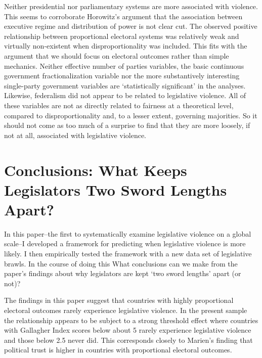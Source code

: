 \documentclass[a4paper]{article}\usepackage{graphicx, color}
\begin{document}
Neither presidential nor parliamentary systems are more associated with violence. This seems to corroborate Horowitz's \citeyearpar{Horowitz1990} argument that the association between executive regime and distribution of power is not clear cut. The observed positive relationship between proportional electoral systems was relatively weak and virtually non-existent when disproportionality was included. This fits with the argument that we should focus on electoral outcomes rather than simple mechanics. Neither effective number of parties variables, the basic continuous government fractionalization variable nor the more substantively interesting single-party government variables are `statistically significant' in the analyses. Likewise, federalism did not appear to be related to legislative violence. All of these variables are not as directly related to fairness at a theoretical level, compared to disproportionality and, to a lesser extent, governing majorities. So it should not come as too much of a surprise to find that they are more loosely, if not at all, associated with legislative violence.

\section*{Conclusions: What Keeps Legislators Two Sword Lengths Apart?}

In this paper--the first to systematically examine legislative violence on a global scale--I developed a framework for predicting when legislative violence is more likely. I then empirically tested the framework with a new data set of legislative brawls. In the course of doing this What conclusions can we make from the paper's findings about why legislators are kept `two sword lengths' apart (or not)?

The findings in this paper suggest that countries with highly proportional electoral outcomes rarely experience legislative violence. In the present sample the relationship appears to be subject to a strong threshold effect where countries with Gallagher Index scores below about 5 rarely experience legislative violence and those below 2.5 never did. This corresponds closely to Marien's \cite{Marien2011} finding that political trust is higher in countries with proportional electoral outcomes. 
\end{document}
